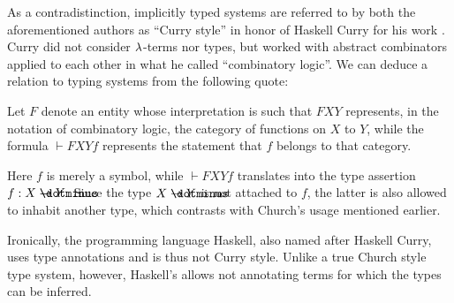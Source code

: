 \begin{remark}
  As a contradistinction, implicitly typed systems are referred to by both the aforementioned authors as \enquote{Curry style} in honor of Haskell Curry for his work \cite{Curry1934FunctionalityInCombinatoryLogic}. Curry did not consider \( \mathrm{\lambda} \)-terms nor types, but worked with abstract combinators applied to each other in what he called \enquote{combinatory logic}. We can deduce a relation to typing systems from the following quote:
  \begin{displayquote}
    Let \( F \) denote an entity whose interpretation is such that \( FXY \) represents, in the notation of combinatory logic, the category of functions on \( X \) to \( Y \), while the formula \( \vdash FXYf \) represents the statement that \( f \) belongs to that category.
  \end{displayquote}

  Here \( f \) is merely a symbol, while \( \vdash FXYf \) translates into the type assertion \( f: X \synimplies Y \). Since the type \( X \synimplies Y \) is not attached to \( f \), the latter is also allowed to inhabit another type, which contrasts with Church's usage mentioned earlier.

  Ironically, the programming language Haskell, also named after Haskell Curry, uses type annotations and is thus not Curry style. Unlike a true Church style type system, however, Haskell's allows not annotating terms for which the types can be inferred.
\end{remark}

